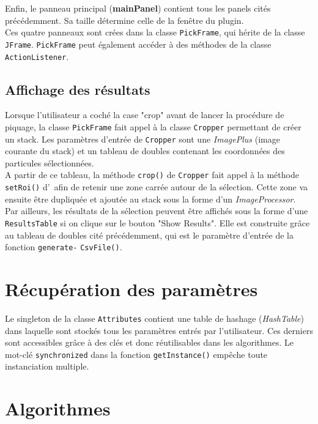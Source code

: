 Enfin, le panneau principal (\textbf{mainPanel}) contient tous les panels cités précédemment. Sa taille détermine celle de la fenêtre du plugin. \\
Ces quatre panneaux sont crées dans la classe \texttt{PickFrame}, qui hérite de la classe \texttt{JFrame}. \texttt{PickFrame} peut également accéder à des méthodes de la classe \texttt{ActionListener}. 

\subsection{Affichage des résultats}

Lorsque l'utilisateur a coché la case "crop" avant de lancer la procédure de piquage, la classe \texttt{PickFrame} fait appel à la classe \texttt{Cropper} permettant de créer un stack. Les paramètres d'entrée de \texttt{Cropper} sont une \emph{ImagePlus} (image courante du stack) et un tableau de doubles contenant les coordonnées des particules sélectionnées. \\
A partir de ce tableau, la méthode \texttt{crop()} de \texttt{Cropper} fait appel à la méthode \texttt{setRoi()} d'\imj ~afin de retenir une zone carrée autour de la sélection. Cette zone va ensuite être dupliquée et ajoutée au stack sous la forme d'un \emph{ImageProcessor}. \\

Par ailleurs, les résultats de la sélection peuvent être affichés sous la forme d'une \texttt{ResultsTable} si on clique sur le bouton "Show Results". Elle est construite grâce au tableau de doubles cité précédemment, qui est le paramètre d'entrée de la fonction \texttt{generate-} \texttt{CsvFile()}. 

\section{Récupération des paramètres}

Le singleton de la classe \texttt{Attributes} contient une table de hashage (\emph{HashTable}) dans laquelle sont stockés tous les paramètres entrés par l'utilisateur. Ces derniers sont accessibles grâce à des clés et donc réutilisables dans les algorithmes. Le mot-clé  \texttt{synchronized} dans la fonction  \texttt{getInstance()} empêche toute instanciation multiple. 

\section{Algorithmes}

